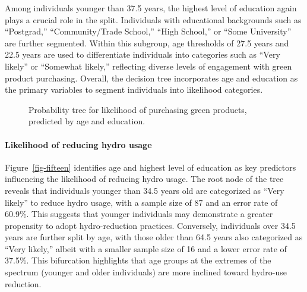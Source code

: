 \documentclass[
  letterpaper,
  DIV=11,
  numbers=noendperiod]{scrartcl}
\let\oldparagraph\paragraph
\renewcommand{\paragraph}[1]{\oldparagraph{#1}\mbox{}}
\begin{document}
Among individuals younger than 37.5 years, the highest level of
education again plays a crucial role in the split. Individuals with
educational backgrounds such as ``Postgrad,'' ``Community/Trade
School,'' ``High School,'' or ``Some University'' are further segmented.
Within this subgroup, age thresholds of 27.5 years and 22.5 years are
used to differentiate individuals into categories such as ``Very
likely'' or ``Somewhat likely,'' reflecting diverse levels of engagement
with green product purchasing. Overall, the decision tree incorporates
age and education as the primary variables to segment individuals into
likelihood categories.

\begin{figure}


\caption{\label{fig-forteen}Probability tree for likelihood of
purchasing green products, predicted by age and education.}

\end{figure}%

\paragraph{Likelihood of reducing hydro
usage}\label{likelihood-of-reducing-hydro-usage}

Figure~\ref{fig-fifteen} identifies age and highest level of education
as key predictors influencing the likelihood of reducing hydro usage.
The root node of the tree reveals that individuals younger than 34.5
years old are categorized as ``Very likely'' to reduce hydro usage, with
a sample size of 87 and an error rate of 60.9\%. This suggests that
younger individuals may demonstrate a greater propensity to adopt
hydro-reduction practices. Conversely, individuals over 34.5 years are
further split by age, with those older than 64.5 years also categorized
as ``Very likely,'' albeit with a smaller sample size of 16 and a lower
error rate of 37.5\%. This bifurcation highlights that age groups at the
extremes of the spectrum (younger and older individuals) are more
inclined toward hydro-use reduction.
\end{document}
